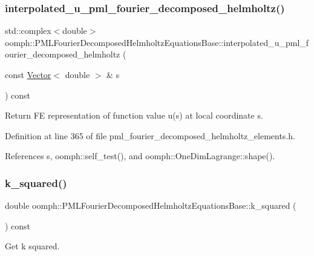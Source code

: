 \subsubsection{\texorpdfstring{interpolated\+\_\+u\+\_\+pml\+\_\+fourier\+\_\+decomposed\+\_\+helmholtz()}{interpolated\_u\_pml\_fourier\_decomposed\_helmholtz()}}
{\footnotesize\ttfamily std\+::complex$<$double$>$ oomph\+::\+P\+M\+L\+Fourier\+Decomposed\+Helmholtz\+Equations\+Base\+::interpolated\+\_\+u\+\_\+pml\+\_\+fourier\+\_\+decomposed\+\_\+helmholtz (\begin{DoxyParamCaption}\item[{const \hyperlink{classoomph_1_1Vector}{Vector}$<$ double $>$ \&}]{s }\end{DoxyParamCaption}) const\hspace{0.3cm}{\ttfamily [inline]}}



Return FE representation of function value u(s) at local coordinate s. 



Definition at line 365 of file pml\+\_\+fourier\+\_\+decomposed\+\_\+helmholtz\+\_\+elements.\+h.



References s, oomph\+::self\+\_\+test(), and oomph\+::\+One\+Dim\+Lagrange\+::shape().

\mbox{\label{classoomph_1_1PMLFourierDecomposedHelmholtzEquationsBase_a1d3e7d3af49caa8403186ea912288cb2}} 
\subsubsection{\texorpdfstring{k\+\_\+squared()}{k\_squared()}}
{\footnotesize\ttfamily double oomph\+::\+P\+M\+L\+Fourier\+Decomposed\+Helmholtz\+Equations\+Base\+::k\+\_\+squared (\begin{DoxyParamCaption}{ }\end{DoxyParamCaption}) const\hspace{0.3cm}{\ttfamily [inline]}}



Get k squared. 



